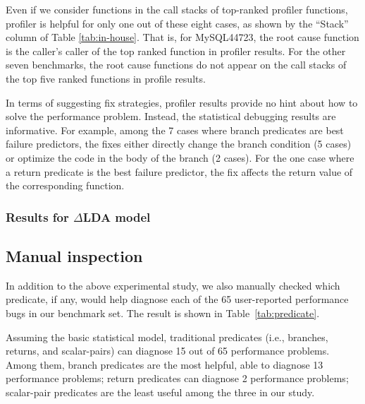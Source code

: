 Even if we consider functions in the call stacks of top-ranked
profiler functions, profiler is helpful for only one out of these eight cases,
as shown by the ``Stack'' column of Table \ref{tab:in-house}. That is, for
MySQL44723, the root cause function is the caller's caller of the top ranked
function in profiler results. For the other seven benchmarks, the root
cause functions do not appear on the call stacks of the top five ranked 
functions in profile results.




In terms of suggesting fix strategies, profiler results provide no hint
about how to solve the performance problem. Instead, the statistical debugging
results are informative.
For example, among the 7 cases where branch predicates are 
best failure predictors, the fixes either directly change the branch condition 
(5 cases) or optimize the code in the body of the branch (2 cases).
For the one case where a return predicate is the best failure predictor,
the fix affects the return value of the corresponding function.


\subsubsection{Results for $\Delta$LDA model}
\label{sec:deltalda_results}





\subsection{Manual inspection}
\label{sec:manual_results}

In addition to the above experimental study, we also manually checked
which predicate, if any, would help diagnose each of the 65 user-reported
performance bugs in our benchmark set. The result is shown in 
Table~\ref{tab:predicate}. 

Assuming the basic statistical model,  
traditional predicates (i.e., branches, returns, and scalar-pairs) 
can diagnose 15 out of 65 performance 
problems. Among them,
branch predicates are the most helpful, able to diagnose 13 performance 
problems; return predicates can diagnose 2 performance problems; 
scalar-pair
predicates are the least useful among the three in our study.




